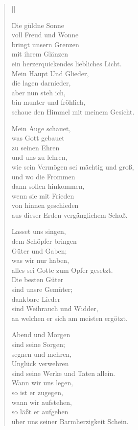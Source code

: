 \begin{multicols}{2}
\settowidth{\versewidth}{ein herzerquickendes liebliches Licht.}
\begin{verse}[\versewidth]

 Die güldne Sonne\\
voll Freud und Wonne\\
bringt unsern Grenzen\\
mit ihrem Glänzen\\
ein herzerquickendes liebliches Licht.\\
Mein Haupt Und Glieder,\\
die lagen darnieder,\\
aber nun steh ich,\\
bin munter und fröhlich,\\
schaue den Himmel mit meinem Gesicht.

 Mein Auge schauet,\\
was Gott gebauet\\
zu seinen Ehren\\
und uns zu lehren,\\
wie sein Vermögen sei mächtig und groß,\\
und wo die Frommen\\
dann sollen hinkommen,\\
wenn sie mit Frieden\\
von hinnen geschieden\\
aus dieser Erden vergänglichem Schoß.

 Lasset uns singen,\\
dem Schöpfer bringen\\
Güter und Gaben;\\
was wir nur haben,\\
alles sei Gotte zum Opfer gesetzt.\\
Die besten Güter\\
sind unsre Gemüter;\\
dankbare Lieder\\
sind Weihrauch und Widder,\\
an welchen er sich am meisten ergötzt.

 Abend und Morgen\\
sind seine Sorgen;\\
segnen und mehren,\\
Unglück verwehren\\
sind seine Werke und Taten allein.\\
Wann wir uns legen,\\
so ist er zugegen,\\
wann wir aufstehen,\\
so läßt er aufgehen\\
über uns seiner Barmherzigkeit Schein.


\end{verse}
\end{multicols}
